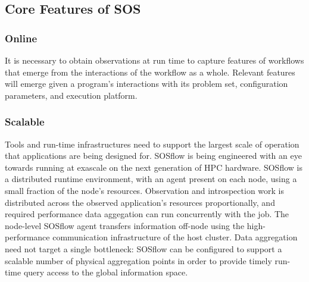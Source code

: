 \subsection{Core Features of SOS}
%
%
%
%
%
%
%
%
%
%
%
%
\subsubsection{Online}
%
It is necessary to obtain observations at run time to capture features
of workflows that emerge from the interactions of the workflow as a
whole.
%
Relevant features will emerge given a program's interactions
with its problem set, configuration parameters, and execution platform.
%
\subsubsection{Scalable}
%
Tools and run-time infrastructures need to support the largest scale of
operation that applications are being designed for.
%
SOSflow is being engineered with an eye towards running at exascale
on the next generation of HPC hardware.
%
SOSflow is a distributed runtime environment, with an agent present
on each node, using a small fraction of the node's resources.
%
Observation and introspection work is distributed across
the observed application's resources proportionally, and required
performance data aggegation can run concurrently with the job.
%
The node-level SOSflow agent transfers information off-node using
the high-performance communication infrastructure of the host cluster.
%
Data aggregation need not target a single bottleneck: SOSflow can
be configured to support a scalable number of physical aggregation
points in order to provide timely run-time query access to the global
information space.
%
